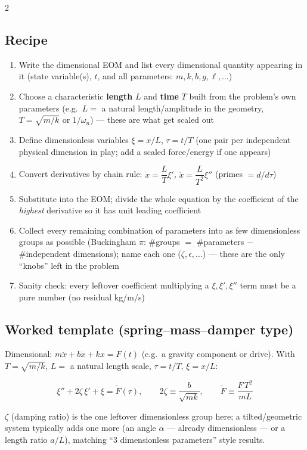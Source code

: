 \documentclass[10pt]{article}
\begin{document}
\begin{multicols}{2}
\subsection*{Recipe}
\begin{enumerate}[nosep, leftmargin=1.3em]
    \item Write the dimensional EOM and list every dimensional quantity appearing in it (state variable(s), $t$, and all parameters: $m,k,b,g,\ell,\dots$)
    \item Choose a characteristic \textbf{length} $L$ and \textbf{time} $T$ built from the problem's own parameters (e.g.\ $L=$ a natural length/amplitude in the geometry, $T=\sqrt{m/k}$ or $1/\omega_n$) --- these are what get scaled out
    \item Define dimensionless variables $\xi=x/L$, $\tau=t/T$ (one pair per independent physical dimension in play; add a scaled force/energy if one appears)
    \item Convert derivatives by chain rule: $\dot x=\dfrac{L}{T}\xi'$, $\ddot x=\dfrac{L}{T^{2}}\xi''$ (primes $=d/d\tau$)
    \item Substitute into the EOM; divide the whole equation by the coefficient of the \emph{highest} derivative so it has unit leading coefficient
    \item Collect every remaining combination of parameters into as few dimensionless groups as possible (Buckingham $\pi$: \#groups $=$ \#parameters $-$ \#independent dimensions); name each one ($\zeta,\epsilon,\dots$) --- these are the only ``knobs'' left in the problem
    \item Sanity check: every leftover coefficient multiplying a $\xi,\xi',\xi''$ term must be a pure number (no residual kg/m/s)
\end{enumerate}

\subsection*{Worked template (spring--mass--damper type)}
Dimensional: $m\ddot x+b\dot x+kx=F(t)$ (e.g.\ a gravity component or drive). With $T=\sqrt{m/k}$, $L=$ a natural length scale, $\tau=t/T$, $\xi=x/L$:
\begin{keybox}
\[
    \xi''+2\zeta\,\xi'+\xi=\tilde F(\tau), \qquad
    2\zeta\equiv\frac{b}{\sqrt{mk}}, \qquad
    \tilde F\equiv\frac{F\,T^{2}}{mL}
\]
\end{keybox}
$\zeta$ (damping ratio) is the one leftover dimensionless group here; a tilted/geometric system typically adds one more (an angle $\alpha$ --- already dimensionless --- or a length ratio $a/L$), matching ``3 dimensionless parameters'' style results.


\end{multicols}
\end{document}
